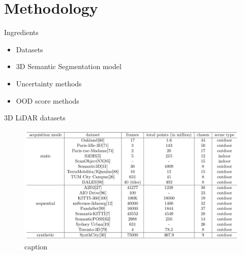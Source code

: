 \documentclass[aspectratio=169]{beamer}
\begin{document}
\section{Methodology}
\begin{frame}{Ingredients}
    \begin{itemize}
        \item Datasets
        \item 3D Semantic Segmentation model
        \item Uncertainty methods
        \item OOD score methods
    \end{itemize}
\end{frame}
\begin{frame}{3D LiDAR datasets}
    \begin{figure}
        \centering
        \includegraphics[scale=0.25]{images/3d_datasets.jpg}
        \caption{caption}
        \label{fig:datasets}
    \end{figure}
\end{frame}
\end{document}
